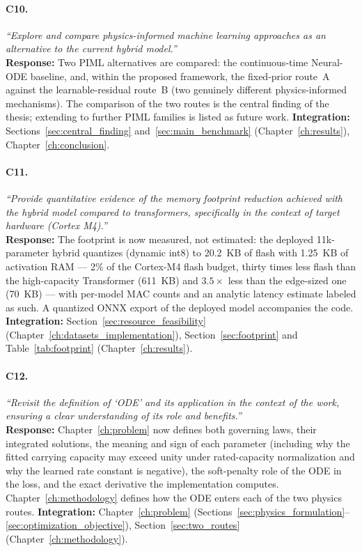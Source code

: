 \paragraph{C10.} \emph{``Explore and compare physics-informed machine learning
approaches as an alternative to the current hybrid model.''}\\
\textbf{Response:} Two PIML alternatives are compared: the continuous-time
Neural-ODE baseline, and, within the proposed framework, the fixed-prior
route~A against the learnable-residual route~B (two genuinely different
physics-informed mechanisms). The comparison of the two routes is the central
finding of the thesis; extending to further PIML families is listed as future
work.
\textbf{Integration:} Sections~\ref{sec:central_finding}
and~\ref{sec:main_benchmark} (Chapter~\ref{ch:results}),
Chapter~\ref{ch:conclusion}.

\paragraph{C11.} \emph{``Provide quantitative evidence of the memory footprint
reduction achieved with the hybrid model compared to transformers, specifically
in the context of target hardware (Cortex M4).''}\\
\textbf{Response:} The footprint is now measured, not estimated: the deployed
11k-parameter hybrid quantizes (dynamic int8) to 20.2~KB of flash with 1.25~KB
of activation RAM --- 2\% of the Cortex-M4 flash budget, thirty times less
flash than the high-capacity Transformer (611~KB) and $3.5\times$ less than the
edge-sized one (70~KB) --- with per-model MAC counts and an analytic latency
estimate labeled as such. A quantized ONNX export of the deployed model
accompanies the code.
\textbf{Integration:} Section~\ref{sec:resource_feasibility}
(Chapter~\ref{ch:datasets_implementation}), Section~\ref{sec:footprint} and
Table~\ref{tab:footprint} (Chapter~\ref{ch:results}).

\paragraph{C12.} \emph{``Revisit the definition of `ODE' and its application in
the context of the work, ensuring a clear understanding of its role and
benefits.''}\\
\textbf{Response:} Chapter~\ref{ch:problem} now defines both governing laws,
their integrated solutions, the meaning and sign of each parameter (including
why the fitted carrying capacity may exceed unity under rated-capacity
normalization and why the learned rate constant is negative), the soft-penalty
role of the ODE in the loss, and the exact derivative the implementation
computes. Chapter~\ref{ch:methodology} defines how the ODE enters each of the
two physics routes.
\textbf{Integration:} Chapter~\ref{ch:problem}
(Sections~\ref{sec:physics_formulation}--\ref{sec:optimization_objective}),
Section~\ref{sec:two_routes} (Chapter~\ref{ch:methodology}).

